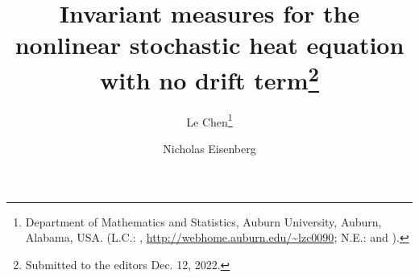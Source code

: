 \usepackage[strict = true,
            style = english]{csquotes}
\usepackage[backend = biber,
						style = numeric,
						natbib = true,
            sorting = nyt,
            maxbibnames=99,
            abbreviate = true,
           ]{biblatex}
\renewcommand*{\bibfont}{\fontsize{11}{11}}

% 



\title{Invariant measures for the nonlinear stochastic heat equation with no drift term\thanks{Submitted to the editors Dec. 12, 2022.
}}

\author{
  Le Chen\thanks{Department of Mathematics and Statistics, Auburn University, Auburn, Alabama, USA.
  (L.C.: , \url{http://webhome.auburn.edu/\~lzc0090};
   N.E.:  and ).}
  \and
  Nicholas Eisenberg\footnotemark[2]
}

\usepackage{amsopn}
\DeclareMathOperator{\diag}{diag}


